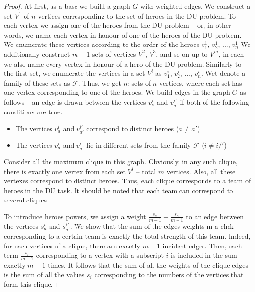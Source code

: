 \documentclass[smallextended]{svjour3}       %
\begin{document}
\begin{proof}
	At first, as a base we build a graph $G$ with weighted edges.
    We construct a set $V^1 $ of $n$ vertices corresponding to the set of heroes in the DU problem. To each vertex we assign one of the heroes from the DU problem -- or, in other words, we name each vertex in honour of one of the heroes of the DU problem. We enumerate these vertices according to the order of the heroes $v_1^1$, $v_2^1$, ..., $ v_n^1$
    We additionally construct $m-1$ sets of vertices $ V^2 $, $ V^3 $, and so on up to $ V^m $, in each we also name every vertex in honour of a hero of the DU problem. Similarly to the first set, we enumerate the vertices in a set $V^i $ as $ v_1^i $, $v_2^i$, ..., $v_n^i$.
    Wet denote a family of these sets as $ \mathcal{F} $. Thus, we get $m$ sets of $n$ vertices, where each set has one vertex corresponding to one of the heroes.
   We build edges in the graph $G$ as follows --  an edge is drawn between the vertices $v_a^i $ and $v_{a'}^{i'} $  if both of the following conditions are true:
    \begin{itemize}
        \item The vertices $v_a^i $ and $v_{a'}^{i'} $ correspond to distinct heroes ($a \neq a'$)
        \item The vertices $v_a^i $ and $v_{a'}^{i'} $ lie in different sets from the family $\mathcal{F}$ ($ i \neq i /'$)
    \end{itemize}

    Consider all the maximum clique in this graph. Obviously, in any such clique, there is exactly one vertex from each set $ V^i $ -- total $m$ vertices. Also, all these vertexes correspond to distinct heroes. Thus, each clique corresponds to a team of heroes in the DU task. It should be noted that each team can correspond to several cliques.
  
    To introduce heroes powers, we assign a weight $ \frac{s_a}{m-1} + \frac{s_{a '}}{m-1}$ to an edge between the vertices $s_a^i$ and $s_ {a'}^{i'}$. We show that the sum of the edges weights in a click corresponding to a certain team is exactly the total strength of this team.
    Indeed, for each vertices of a clique, there are exactly $m-1$ incident edges. Then, each term $\frac{s_i}{m-1}$ corresponding to a vertex with a subscript $i$ is included in the sum exactly $m-1$ times. It follows that the sum of all the weights of the clique edges is the sum of all the values $s_i$ corresponding to the numbers of the vertices that form this clique.      
    

\end{proof}
\end{document}
